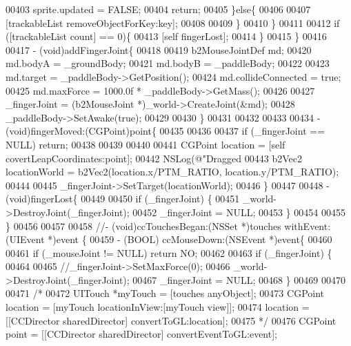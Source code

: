 \begin{DoxyCode}
{{{{{{00403             sprite.updated = FALSE;
00404             \textcolor{keywordflow}{return};
00405         \}\textcolor{keywordflow}{else}\{
00406             
00407             [trackableList removeObjectForKey:key];
00408             
00409         \}
00410     \}
00411     
00412     \textcolor{keywordflow}{if} ([trackableList count] == 0)\{
00413         [\textcolor{keyword}{self} fingerLost];
00414     \}
00415 \}
00416 
00417 - (void)addFingerJoint\{
00418     
00419     b2MouseJointDef md;
00420     md.bodyA = \_groundBody;
00421     md.bodyB = \_paddleBody;
00422     
00423     md.target = \_paddleBody->GetPosition();
00424     md.collideConnected = \textcolor{keyword}{true};
00425     md.maxForce = 1000.0f * \_paddleBody->GetMass();
00426     
00427     \_fingerJoint = (b2MouseJoint *)\_world->CreateJoint(&md);
00428     \_paddleBody->SetAwake(\textcolor{keyword}{true});
00429 
00430 \}
00431 
00432 
00433 
00434 - (void)fingerMoved:(CGPoint)point\{
00435    
00436 
00437     \textcolor{keywordflow}{if} (\_fingerJoint == NULL) \textcolor{keywordflow}{return};
00438 
00439     
00440 
00441     CGPoint location = [\textcolor{keyword}{self} covertLeapCoordinates:point];
00442     NSLog(\textcolor{stringliteral}{@"Dragged %
00443     b2Vec2 locationWorld = b2Vec2(location.x/PTM\_RATIO, location.y/PTM\_RATIO);
00444     
00445     \_fingerJoint->SetTarget(locationWorld);
00446 \}
00447 
00448 - (void)fingerLost\{
00449   
00450     \textcolor{keywordflow}{if} (\_fingerJoint) \{
00451         \_world->DestroyJoint(\_fingerJoint);
00452         \_fingerJoint = NULL;
00453     \}
00454 
00455 \}
00456 
00457 
00458 \textcolor{comment}{//- (void)ccTouchesBegan:(NSSet *)touches withEvent:(UIEvent *)event \{}
00459 - (BOOL) ccMouseDown:(NSEvent *)event\{
00460     
00461     \textcolor{keywordflow}{if} (\_mouseJoint != NULL) \textcolor{keywordflow}{return} NO;
00462     
00463     \textcolor{keywordflow}{if} (\_fingerJoint) \{
00464         
00465         \textcolor{comment}{//\_fingerJoint->SetMaxForce(0);}
00466         \_world->DestroyJoint(\_fingerJoint);
00467         \_fingerJoint = NULL;
00468     \}
00469     
00470     
00471     \textcolor{comment}{/*}
00472 \textcolor{comment}{    UITouch *myTouch = [touches anyObject];}
00473 \textcolor{comment}{    CGPoint location = [myTouch locationInView:[myTouch view]];}
00474 \textcolor{comment}{    location = [[CCDirector sharedDirector] convertToGL:location];}
00475 \textcolor{comment}{    */}
00476     CGPoint point = [[CCDirector sharedDirector] convertEventToGL:event];
}}}}}}}
\end{DoxyCode}
